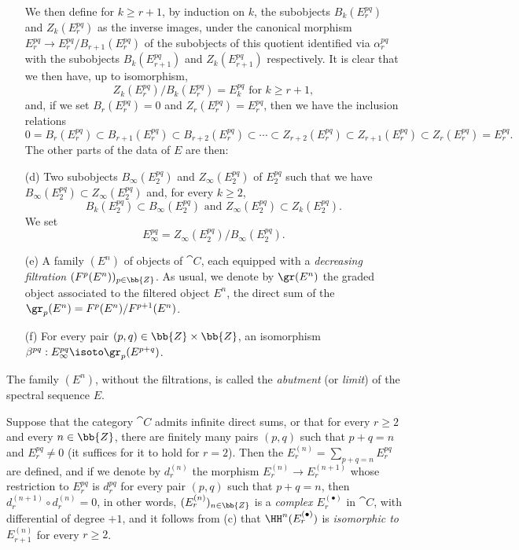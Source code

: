 \begin{env}[11.1.1]
\begin{enumerate}
  We then define for $k\geq r+1$, by induction on $k$, the subobjects $B_k(E_r^{pq})$ and $Z_k(E_r^{pq})$ as the inverse images, under the canonical morphism $E_r^{pq}\to E_r^{pq}/B_{r+1}(E_r^{pq})$ of the subobjects of this quotient identified via $\alpha_r^{pq}$ with the subobjects $B_k(E_{r+1}^{pq})$ and $Z_k(E_{r+1}^{pq})$ respectively.
It is clear that we then have, up to isomorphism,
  \[
  \label{0.11.1.1.1}
    Z_k(E_r^{pq})/B_k(E_r^{pq})=E_k^{pq}\text{ for }k\geq r+1,
    \tag{11.1.1.1}
  \]
  and, if we set $B_r(E_r^{pq})=0$ and $Z_r(E_r^{pq})=E_r^{pq}$, then we have the inclusion relations
  \[
  \label{0.11.1.1.2}
    0=B_r(E_r^{pq})\subset B_{r+1}(E_r^{pq})\subset B_{r+2}(E_r^{pq})\subset\cdots\subset Z_{r+2}(E_r^{pq})\subset Z_{r+1}(E_r^{pq})\subset Z_r(E_r^{pq})=E_r^{pq}.
    \tag{11.1.1.2}
  \]
  The other parts of the data of $E$ are then:
  \item[(d)] Two subobjects $B_\infty(E_2^{pq})$ and $Z_\infty(E_2^{pq})$ of $E_2^{pq}$ such that we have $B_\infty(E_2^{pq})\subset Z_\infty(E_2^{pq})$ and, for every $k\geq 2$,
    \[
      B_k(E_2^{pq})\subset B_\infty(E_2^{pq})\text{ and }Z_\infty(E_2^{pq})\subset Z_k(E_2^{pq}).
    \]
    We set
    \[
    \label{0.11.1.1.3}
      E_\infty^{pq}=Z_\infty(E_2^{pq})/B_\infty(E_2^{pq}).
      \tag{11.1.1.3}
    \]
  \item[(e)]
    A family $(E^n)$ of objects of $\cat{C}$, each equipped with a \emph{decreasing filtration $(F^p(E^n))_{p\in\bb{Z}}$}.
    As usual, we denote by $\gr(E^n)$ the graded object associated to the filtered object $E^n$, the direct sum of the $\gr_p(E^n)=F^p(E^n)/F^{p+1}(E^n)$.
  \item[(f)] For every pair $(p,q)\in\bb{Z}\times\bb{Z}$, an isomorphism $\beta^{pq}:E_\infty^{pq}\isoto\gr_p(E^{p+q})$.
\end{enumerate}

The family $(E^n)$, without the filtrations, is called the \emph{abutment} (or \emph{limit}) of the spectral sequence $E$.

Suppose that the category $\cat{C}$ admits infinite direct sums, or that for every $r\geq 2$ and every $n\in\bb{Z}$, there are finitely many pairs $(p,q)$ such that $p+q=n$ and $E_r^{pq}\neq 0$ (it suffices for it to hold for $r=2$).
Then the $E_r^{(n)}=\sum_{p+q=n}E_r^{pq}$ are defined, and if we denote by $d_r^{(n)}$ the morphism $E_r^{(n)}\to E_r^{(n+1)}$ whose restriction to $E_r^{pq}$ is $d_r^{pq}$ for every pair $(p,q)$ such that $p+q=n$, then $d_r^{(n+1)}\circ d_r^{(n)}=0$, in other words, $(E_r^{(n)})_{n\in\bb{Z}}$ is a \emph{complex $E_r^{(\bullet)}$} in $\cat{C}$, with differential of degree $+1$, and it follows from (c) that $\HH^n(E_r^{(\bullet)})$ is \emph{isomorphic to $E_{r+1}^{(n)}$} for every $r\geq 2$.
\end{env}

